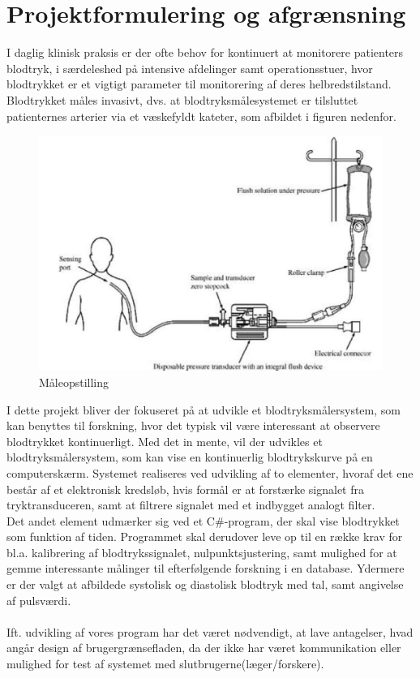\chapter{Projektformulering og afgrænsning}
I daglig klinisk praksis er der ofte behov for kontinuert at monitorere patienters blodtryk, i særdeleshed på intensive afdelinger samt operationsstuer, hvor blodtrykket er et vigtigt parameter til monitorering af deres helbredstilstand. \\
Blodtrykket måles invasivt, dvs. at blodtryksmålesystemet er tilsluttet patienternes arterier via et væskefyldt kateter, som afbildet i figuren nedenfor.
\begin{figure}[H]
	\centering
	\includegraphics[width=1\textwidth]{Figurer/Snip20151207_50}
	\caption{Måleopstilling}
\end{figure}

I dette projekt bliver der fokuseret på at udvikle et blodtryksmålersystem, som kan benyttes til forskning, hvor det typisk vil være interessant at observere blodtrykket kontinuerligt. 
Med det in mente, vil der udvikles et blodtryksmålersystem, som kan vise en kontinuerlig blodtrykskurve på en computerskærm.
Systemet realiseres ved udvikling af to elementer, hvoraf det ene består af et elektronisk kredsløb, hvis formål er at forstærke signalet fra tryktransduceren, samt at filtrere signalet med et indbygget analogt filter.\\
Det andet element udmærker sig ved et C\#-program, der skal vise blodtrykket som funktion af tiden. Programmet skal derudover leve op til en række krav for bl.a. kalibrering af blodtrykssignalet, nulpunktsjustering, samt mulighed for at gemme interessante målinger til efterfølgende forskning i en database.
Ydermere er der valgt at afbildede systolisk og diastolisk blodtryk med tal, samt angivelse af pulsværdi.\\\\
Ift. udvikling af vores program har det været nødvendigt, at lave antagelser, hvad angår design af brugergrænsefladen, da der ikke har været kommunikation eller mulighed for test af systemet med slutbrugerne(læger/forskere). 


